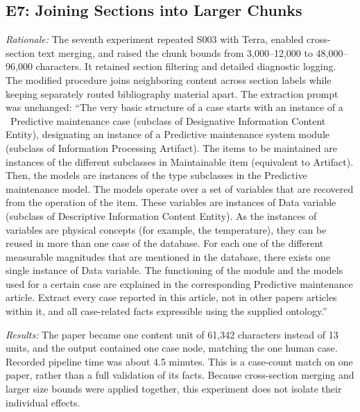 \documentclass[journal]{IEEEtran}
\newcommand{\caseDefinitionPrompt}{The very basic structure of a case starts with an instance of a \ \textasciigrave{}Predictive maintenance case\textasciigrave{} (subclass of \textasciigrave{}Designative Information Content Entity\textasciigrave{}), designating an instance of a \textasciigrave{}Predictive maintenance system module\textasciigrave{} (subclass of \textasciigrave{}Information Processing Artifact\textasciigrave{}). The items to be maintained are instances of the diﬀerent subclasses in \textasciigrave{}Maintainable item\textasciigrave{} (equivalent to \textasciigrave{}Artifact\textasciigrave{}). Then, the models are instances of the type subclasses in the \textasciigrave{}Predictive maintenance model\textasciigrave{}. The models operate over a set of variables that are recovered from the operation of the item. These variables are instances of \textasciigrave{}Data variable\textasciigrave{} (subclass of \textasciigrave{}Descriptive Information Content Entity\textasciigrave{}). As the instances of variables are physical concepts (for example, the temperature), they can be reused in more than one case of the database. For each one of the diﬀerent measurable magnitudes that are mentioned in the database, there exists one single instance of \textasciigrave{}Data variable\textasciigrave{}. The functioning of the module and the models used for a certain case are explained in the corresponding \textasciigrave{}Predictive maintenance article\textasciigrave{}. Extract every case reported in this article, not in other papers articles within it, and all case-related facts expressible using the supplied ontology.}
\begin{document}
\subsection{E7: Joining Sections into Larger Chunks}
\label{exp:large-chunks}

\emph{Rationale:} The seventh experiment repeated S003 with Terra, enabled cross-section text merging, and raised the chunk bounds from 3,000--12,000 to 48,000--96,000 characters. It retained section filtering and detailed diagnostic logging. The modified procedure joins neighboring content across section labels while keeping separately routed bibliography material apart. The extraction prompt was unchanged: ``\caseDefinitionPrompt''

\emph{Results:} The paper became one content unit of 61,342 characters instead of 13 units, and the output contained one case node, matching the one human case. Recorded pipeline time was about 4.5 minutes. This is a case-count match on one paper, rather than a full validation of its facts. Because cross-section merging and larger size bounds were applied together, this experiment does not isolate their individual effects.
\end{document}
